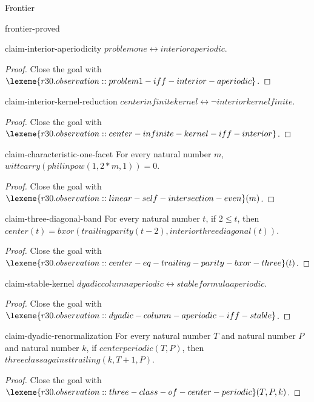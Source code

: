 \begin{lexlean}{Frontier}
\begin{section}{frontier-proved}
\begin{theorem}{claim-interior-aperiodicity}
\(problemone ↔ interioraperiodic\).
\begin{proof}
Close the goal with \(\lexeme{r30.observation::problem1-iff-interior-aperiodic}\).
\end{proof}
\end{theorem}

\begin{theorem}{claim-interior-kernel-reduction}
\(centerinfinitekernel ↔ ¬ interiorkernelfinite\).
\begin{proof}
Close the goal with \(\lexeme{r30.observation::center-infinite-kernel-iff-interior}\).
\end{proof}
\end{theorem}

\begin{theorem}{claim-characteristic-one-facet}
For every natural number \(m\), \(wittcarry(philinpow(1, 2 * m, 1)) = 0\).
\begin{proof}
Close the goal with \(\lexeme{r30.observation::linear-self-intersection-even}(m)\).
\end{proof}
\end{theorem}

\begin{theorem}{claim-three-diagonal-band}
For every natural number \(t\), if \(2 ≤ t\), then \(center(t) = bxor(trailingparity(t - 2), interiorthreediagonal(t))\).
\begin{proof}
Close the goal with \(\lexeme{r30.observation::center-eq-trailing-parity-bxor-three}(t)\).
\end{proof}
\end{theorem}

\begin{theorem}{claim-stable-kernel}
\(dyadiccolumnaperiodic ↔ stableformulaaperiodic\).
\begin{proof}
Close the goal with \(\lexeme{r30.observation::dyadic-column-aperiodic-iff-stable}\).
\end{proof}
\end{theorem}

\begin{theorem}{claim-dyadic-renormalization}
For every natural number \(T\) and natural number \(P\) and natural number \(k\), if \(centerperiodic(T, P)\), then \(threeclassagainsttrailing(k, T + 1, P)\).
\begin{proof}
Close the goal with \(\lexeme{r30.observation::three-class-of-center-periodic}(T, P, k)\).
\end{proof}
\end{theorem}


\end{section}
\end{lexlean}
